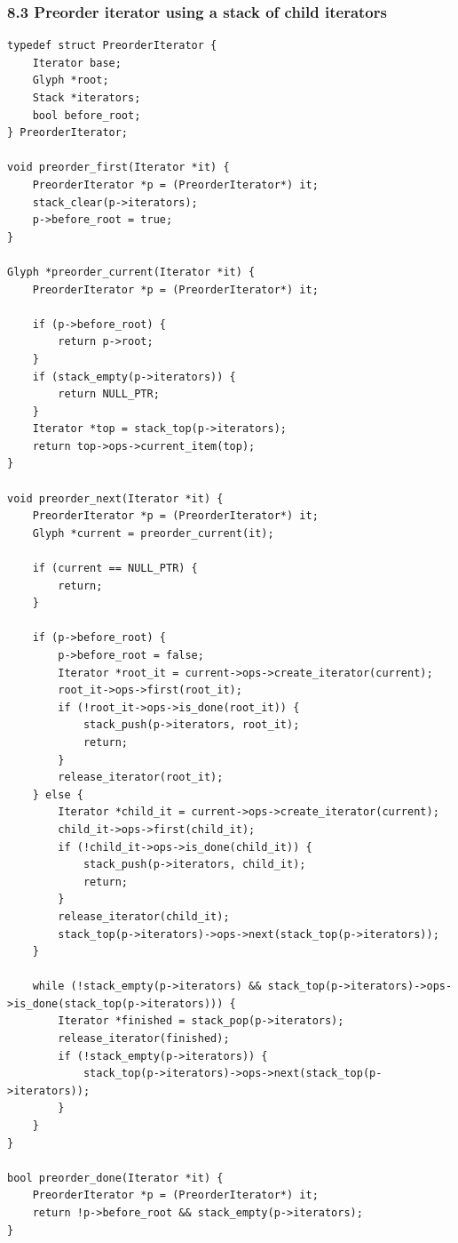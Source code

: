 \documentclass[11pt]{article}
\begin{document}
\subsubsection{8.3 Preorder iterator using a stack of child iterators}\label{preorder-iterator-using-a-stack-of-child-iterators}

\begin{verbatim}
typedef struct PreorderIterator {
    Iterator base;
    Glyph *root;
    Stack *iterators;
    bool before_root;
} PreorderIterator;

void preorder_first(Iterator *it) {
    PreorderIterator *p = (PreorderIterator*) it;
    stack_clear(p->iterators);
    p->before_root = true;
}

Glyph *preorder_current(Iterator *it) {
    PreorderIterator *p = (PreorderIterator*) it;

    if (p->before_root) {
        return p->root;
    }
    if (stack_empty(p->iterators)) {
        return NULL_PTR;
    }
    Iterator *top = stack_top(p->iterators);
    return top->ops->current_item(top);
}

void preorder_next(Iterator *it) {
    PreorderIterator *p = (PreorderIterator*) it;
    Glyph *current = preorder_current(it);

    if (current == NULL_PTR) {
        return;
    }

    if (p->before_root) {
        p->before_root = false;
        Iterator *root_it = current->ops->create_iterator(current);
        root_it->ops->first(root_it);
        if (!root_it->ops->is_done(root_it)) {
            stack_push(p->iterators, root_it);
            return;
        }
        release_iterator(root_it);
    } else {
        Iterator *child_it = current->ops->create_iterator(current);
        child_it->ops->first(child_it);
        if (!child_it->ops->is_done(child_it)) {
            stack_push(p->iterators, child_it);
            return;
        }
        release_iterator(child_it);
        stack_top(p->iterators)->ops->next(stack_top(p->iterators));
    }

    while (!stack_empty(p->iterators) && stack_top(p->iterators)->ops->is_done(stack_top(p->iterators))) {
        Iterator *finished = stack_pop(p->iterators);
        release_iterator(finished);
        if (!stack_empty(p->iterators)) {
            stack_top(p->iterators)->ops->next(stack_top(p->iterators));
        }
    }
}

bool preorder_done(Iterator *it) {
    PreorderIterator *p = (PreorderIterator*) it;
    return !p->before_root && stack_empty(p->iterators);
}
\end{verbatim}
\end{document}
